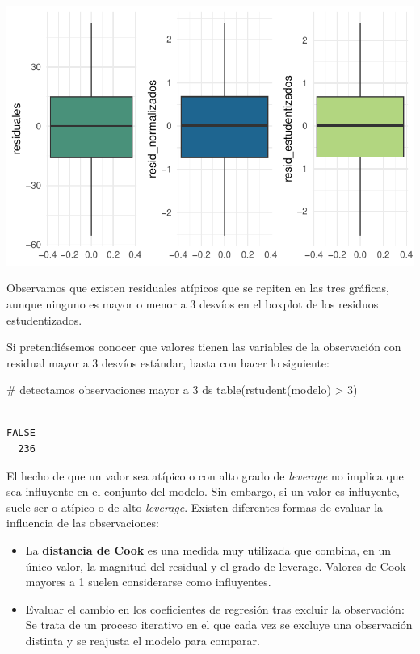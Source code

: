 \documentclass[
  letterpaper,
  DIV=11,
  numbers=noendperiod]{scrartcl}
\newenvironment{Shaded}{\begin{snugshade}}{\end{snugshade}}
\newcommand{\CommentTok}[1]{\textcolor[rgb]{0.37,0.37,0.37}{#1}}
\newcommand{\DecValTok}[1]{\textcolor[rgb]{0.68,0.00,0.00}{#1}}
\newcommand{\FunctionTok}[1]{\textcolor[rgb]{0.28,0.35,0.67}{#1}}
\newcommand{\NormalTok}[1]{\textcolor[rgb]{0.00,0.23,0.31}{#1}}
\newcommand{\SpecialCharTok}[1]{\textcolor[rgb]{0.37,0.37,0.37}{#1}}
\begin{document}
\begin{center}
\includegraphics{index_files/figure-pdf/unnamed-chunk-36-1.pdf}
\end{center}

Observamos que existen residuales atípicos que se repiten en las tres
gráficas, aunque ninguno es mayor o menor a 3 desvíos en el boxplot de
los residuos estudentizados.

Si pretendiésemos conocer que valores tienen las variables de la
observación con residual mayor a 3 desvíos estándar, basta con hacer lo
siguiente:

\begin{Shaded}
\begin{Highlighting}[]
\CommentTok{\# detectamos observaciones mayor a 3 ds}
\FunctionTok{table}\NormalTok{(}\FunctionTok{rstudent}\NormalTok{(modelo) }\SpecialCharTok{\textgreater{}} \DecValTok{3}\NormalTok{)}
\end{Highlighting}
\end{Shaded}

\begin{verbatim}

FALSE 
  236 
\end{verbatim}

El hecho de que un valor sea atípico o con alto grado de \emph{leverage}
no implica que sea influyente en el conjunto del modelo. Sin embargo, si
un valor es influyente, suele ser o atípico o de alto \emph{leverage}.
Existen diferentes formas de evaluar la influencia de las observaciones:

\begin{itemize}
\item
  La \textbf{distancia de Cook} es una medida muy utilizada que combina,
  en un único valor, la magnitud del residual y el grado de leverage.
  Valores de Cook mayores a 1 suelen considerarse como influyentes.
\item
  Evaluar el cambio en los coeficientes de regresión tras excluir la
  observación: Se trata de un proceso iterativo en el que cada vez se
  excluye una observación distinta y se reajusta el modelo para
  comparar.
\end{itemize}
\end{document}
